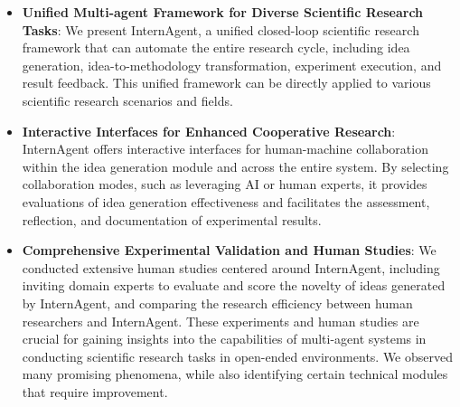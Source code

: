 \begin{itemize}
    \item \textbf{Unified Multi-agent Framework for Diverse Scientific Research Tasks}: 
    We present InternAgent, a unified closed-loop scientific research framework that can automate the entire research cycle, including idea generation, idea-to-methodology transformation, experiment execution, and result feedback. This unified framework can be directly applied to various scientific research scenarios and fields.
    \item \textbf{Interactive Interfaces for Enhanced Cooperative Research}: InternAgent offers interactive interfaces for human-machine collaboration within the idea generation module and across the entire system. By selecting collaboration modes, such as leveraging AI or human experts, it provides evaluations of idea generation effectiveness and facilitates the assessment, reflection, and documentation of experimental results.
    \item \textbf{Comprehensive Experimental Validation and Human Studies}: We conducted extensive human studies centered around InternAgent, including inviting domain experts to evaluate and score the novelty of ideas generated by InternAgent, and comparing the research efficiency between human researchers and InternAgent. These experiments and human studies are crucial for gaining insights into the capabilities of multi-agent systems in conducting scientific research tasks in open-ended environments. We observed many promising phenomena, while also identifying certain technical modules that require improvement.
\end{itemize}


